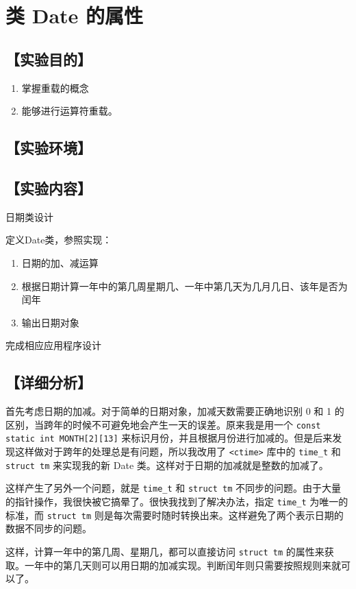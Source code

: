 \section{类 Date 的属性}
\hfill{}
\subsection*{【实验目的】}
\begin{enumerate}[label={\arabic*、}]
\item 掌握重载的概念
\item 能够进行运算符重载。
\end{enumerate}
\subsection*{【实验环境】}
\MyEnvironment
\subsection*{【实验内容】}
日期类设计

定义Date类，参照实现：
\begin{enumerate}[label={(\arabic*)}]
\item 日期的加、减运算
\item 根据日期计算一年中的第几周星期几、一年中第几天为几月几日、该年是否为闰年
\item 输出日期对象
\end{enumerate}

完成相应应用程序设计
\subsection*{【详细分析】}
首先考虑日期的加减。对于简单的日期对象，加减天数需要正确地识别 0 和 1 的区别，当跨年的时候不可避免地会产生一天的误差。原来我是用一个 \verb|const static int MONTH[2][13]| 来标识月份，并且根据月份进行加减的。但是后来发现这样做对于跨年的处理总是有问题，所以我改用了 \verb|<ctime>| 库中的 \verb|time_t| 和 \verb|struct tm| 来实现我的新 Date 类。这样对于日期的加减就是整数的加减了。

这样产生了另外一个问题，就是 \verb|time_t| 和 \verb|struct tm| 不同步的问题。由于大量的指针操作，我很快被它搞晕了。很快我找到了解决办法，指定 \verb|time_t| 为唯一的标准，而 \verb|struct tm| 则是每次需要时随时转换出来。这样避免了两个表示日期的数据不同步的问题。

这样，计算一年中的第几周、星期几，都可以直接访问 \verb|struct tm| 的属性来获取。一年中的第几天则可以用日期的加减实现。判断闰年则只需要按照规则来就可以了。

